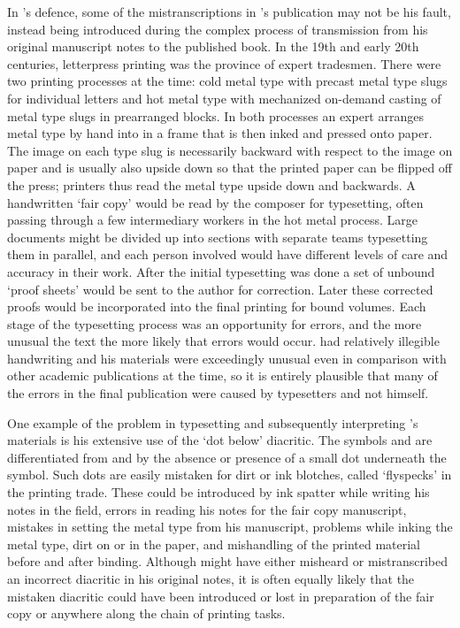 In \citeauthor{swanton:1909}’s defence, some of the mistranscriptions in \citeauthor{swanton:1909}’s publication may not be his fault, instead being introduced during the complex process of transmission from his original manuscript notes to the published book.
In the 19th and early 20th centuries, letterpress printing was the province of expert tradesmen.
There were two printing processes at the time: cold metal type with precast metal type slugs for individual letters and hot metal type with mechanized on-demand casting of metal type slugs in prearranged blocks.
In both processes an expert arranges metal type by hand into in a frame that is then inked and pressed onto paper.
The image on each type slug is necessarily backward with respect to the image on paper and is usually also upside down so that the printed paper can be flipped off the press; printers thus read the metal type upside down and backwards.
A handwritten ‘fair copy’ would be read by the composer for typesetting, often passing through a few intermediary workers in the hot metal process.
Large documents might be divided up into sections with separate teams typesetting them in parallel, and each person involved would have different levels of care and accuracy in their work.
After the initial typesetting was done a set of unbound ‘proof sheets’ would be sent to the author for correction.
Later these corrected proofs would be incorporated into the final printing for bound volumes.
Each stage of the typesetting process was an opportunity for errors, and the more unusual the text the more likely that errors would occur.
\citeauthor{swanton:1909} had relatively illegible handwriting and his materials were exceedingly unusual even in comparison with other academic publications at the time, so it is entirely plausible that many of the errors in the final publication were caused by typesetters and not \citeauthor{swanton:1909} himself.

One example of the problem in typesetting and subsequently interpreting \citeauthor{swanton:1909}’s materials is his extensive use of the ‘dot below’ diacritic.
The symbols  and  are differentiated from  and  by the absence or presence of a small dot underneath the symbol.
Such dots are easily mistaken for dirt or ink blotches, called ‘flyspecks’ in the printing trade.
These could be introduced by ink spatter while writing his notes in the field, errors in reading his notes for the fair copy manuscript, mistakes in setting the metal type from his manuscript, problems while inking the metal type, dirt on or in the paper, and mishandling of the printed material before and after binding.
Although \citeauthor{swanton:1909} might have either misheard or mistranscribed an incorrect diacritic in his original notes, it is often equally likely that the mistaken diacritic could have been introduced or lost in preparation of the fair copy or anywhere along the chain of printing tasks.

